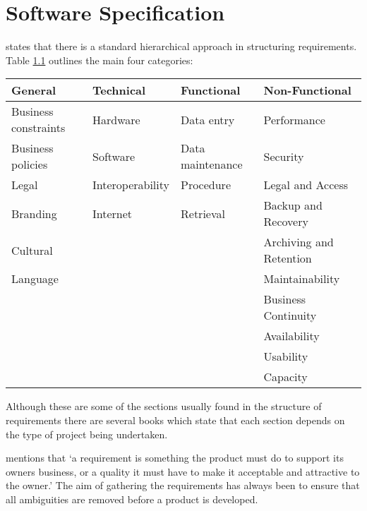 \chapter{Software Specification} 
\label{chap:requirements} 

\citet{cadle10} states that there is a standard hierarchical approach in
structuring requirements. Table \ref{table:requirementsCategories} outlines the
main four categories:

\begin{table}[H]   
  \begin{tabular}{|l|l|l|l|}
  \hline     
  {\bf General}        & {\bf Technical}  & {\bf Functional} & {\bf Non-Functional}    \\ 
  \hline
  Business constraints & Hardware         & Data entry       & Performance             \\      
  Business policies    & Software         & Data maintenance & Security                \\      
  Legal                & Interoperability & Procedure        & Legal and Access        \\      
  Branding             & Internet         & Retrieval        & Backup and Recovery     \\      
  Cultural             & ~                & ~                & Archiving and Retention \\      
  Language             & ~                & ~                & Maintainability         \\      
  ~                    & ~                & ~                & Business Continuity     \\      
  ~                    & ~                & ~                & Availability            \\      
  ~                    & ~                & ~                & Usability               \\      
  ~                    & ~                & ~                & Capacity                \\     
  \hline   
  \end{tabular}
  \label{table:requirementsCategories} 
\end{table}


Although these are some of the sections usually found in the structure of
requirements there are several books which state that each section depends on
the type of project being undertaken. 

\citet{robertson13} mentions that `a requirement is something the product must 
do to support its owners business, or a quality it must have to make it 
acceptable and attractive to the owner.' The aim of gathering the requirements 
has always been to ensure that all ambiguities are removed before a product is 
developed. 

